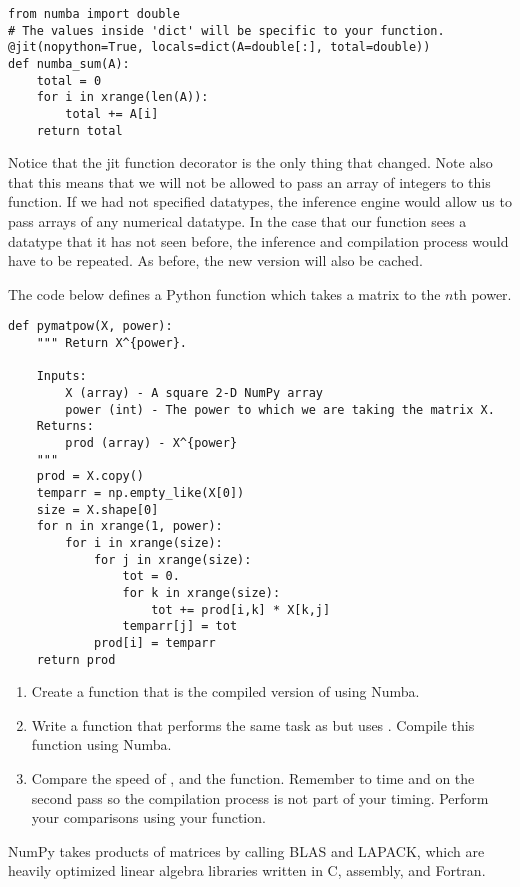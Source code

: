 \begin{lstlisting}
from numba import double
# The values inside 'dict' will be specific to your function.
@jit(nopython=True, locals=dict(A=double[:], total=double))
def numba_sum(A):
    total = 0
    for i in xrange(len(A)):
        total += A[i]
    return total
\end{lstlisting}
Notice that the jit function decorator is the only thing that changed. Note also that this means that we will not be allowed to pass an array of integers to this function. If we had not specified datatypes, the inference engine would allow us to pass arrays of any numerical datatype. In the case that our function sees a datatype that it has not seen before, the inference and compilation process would have to be repeated. As before, the new version will also be cached.

\begin{problem}
The code below defines a Python function which takes a matrix to the $n$th power.
\begin{lstlisting}
def pymatpow(X, power):
    """ Return X^{power}.

    Inputs:
        X (array) - A square 2-D NumPy array
        power (int) - The power to which we are taking the matrix X.
    Returns:
        prod (array) - X^{power}
    """
    prod = X.copy()
    temparr = np.empty_like(X[0])
    size = X.shape[0]
    for n in xrange(1, power):
        for i in xrange(size):
            for j in xrange(size):
                tot = 0.
                for k in xrange(size):
                    tot += prod[i,k] * X[k,j]
                temparr[j] = tot
            prod[i] = temparr
    return prod
\end{lstlisting}

\begin{enumerate}
\item Create a function  that is the compiled version of  using Numba.
\item Write a function  that performs the same task as  but uses . Compile this function using Numba.
\item Compare the speed of ,   and the  function. Remember to time  and  on the second pass so the compilation process is not part of your timing. Perform your comparisons using your  function.
\end{enumerate}

NumPy takes products of matrices by calling BLAS and LAPACK, which are heavily optimized linear algebra libraries written in C, assembly, and Fortran.
\end{problem}

